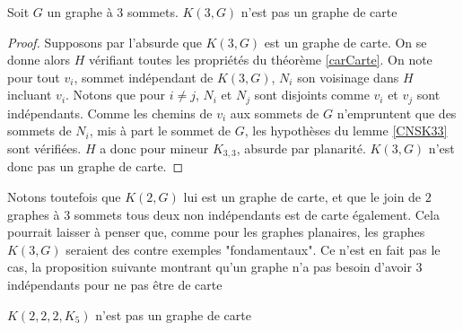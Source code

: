 \documentclass{scrartcl}
\begin{document}
\begin{flushleft}
\begin{prop}\label{K3G}
    Soit $G$ un graphe à $3$ sommets. $K(3, G)$ n'est pas un graphe de carte
\end{prop}

\begin{proof}
    Supposons par l'absurde que $K(3, G)$ est un graphe de carte. On se donne alors $H$ vérifiant toutes les propriétés
    du théorème \ref{carCarte}. On note pour tout $v_i$, sommet indépendant de $K(3, G)$, $N_i$ son voisinage dans $H$
    incluant $v_i$. Notons que pour $i \neq j$, $N_i$ et $N_j$ sont disjoints comme $v_i$ et $v_j$ sont indépendants.
    Comme les chemins de $v_i$ aux sommets de $G$ n'empruntent que des sommets de $N_i$, mis à part le sommet de $G$,
    les hypothèses du lemme \ref{CNSK33} sont vérifiées. $H$ a donc pour mineur $K_{3,3}$, absurde par planarité.
    $K(3, G)$ n'est donc pas un graphe de carte.
\end{proof}

Notons toutefois que $K(2, G)$ lui est un graphe de carte, et que le join de $2$ graphes à $3$ sommets tous deux non indépendants
est de carte également. Cela pourrait laisser à penser que, comme pour les graphes planaires, les graphes $K(3, G)$ seraient des
contre exemples "fondamentaux". Ce n'est en fait pas le cas, la proposition suivante montrant qu'un graphe n'a pas besoin
d'avoir $3$ indépendants pour ne pas être de carte

\begin{prop}\label{K222K5}
    $K(2,2,2,K_5)$ n'est pas un graphe de carte
\end{prop}


\end{flushleft}
\end{document}
